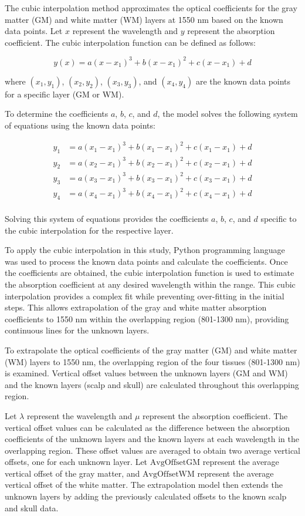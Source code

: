 \documentclass[journal,twoside,web]{ieeecolor}
\begin{document}
The cubic interpolation method approximates the optical coefficients for the gray matter (GM) and white matter (WM) layers at 1550 nm based on the 
known data points. Let $x$ represent the wavelength and $y$ represent the absorption coefficient. The cubic interpolation function can be defined as follows:

\[
y(x) = a(x-x_1)^3 + b(x-x_1)^2 + c(x-x_1) + d
\]

where $(x_1, y_1)$, $(x_2, y_2)$, $(x_3, y_3)$, and $(x_4, y_4)$ are the known data points for a specific layer (GM or WM).

To determine the coefficients $a$, $b$, $c$, and $d$, the model solves the following system of equations using the known data points:

\[
\begin{aligned}
y_1 &= a(x_1-x_1)^3 + b(x_1-x_1)^2 + c(x_1-x_1) + d \\
y_2 &= a(x_2-x_1)^3 + b(x_2-x_1)^2 + c(x_2-x_1) + d \\
y_3 &= a(x_3-x_1)^3 + b(x_3-x_1)^2 + c(x_3-x_1) + d \\
y_4 &= a(x_4-x_1)^3 + b(x_4-x_1)^2 + c(x_4-x_1) + d \\
\end{aligned}
\]

Solving this system of equations provides the coefficients $a$, $b$, $c$, and $d$ specific to the cubic interpolation for the respective layer.

To apply the cubic interpolation in this study, Python programming language was used to process the known data points and calculate the coefficients. 
Once the coefficients are obtained, the cubic interpolation function is used to estimate the absorption coefficient at any desired wavelength within the range. 
This cubic interpolation provides a complex fit while preventing over-fitting in the initial steps. This allows extrapolation of the gray and white matter 
absorption coefficients to 1550 nm within the overlapping region (801-1300 nm), providing continuous lines for the unknown layers.

To extrapolate the optical coefficients of the gray matter (GM) and white matter (WM) layers to 1550 nm, the overlapping region of the four tissues 
(801-1300 nm) is examined. Vertical offset values between the unknown layers (GM and WM) and the known layers (scalp and skull) are calculated throughout 
this overlapping region.

Let \( \lambda \) represent the wavelength and \( \mu \) represent the absorption coefficient. The vertical offset values can be calculated as the difference 
between the absorption coefficients of the unknown layers and the known layers at each wavelength in the overlapping region. These offset values are averaged 
to obtain two average vertical offsets, one for each unknown layer. Let \( \text{AvgOffsetGM} \) represent the average vertical offset of the gray matter, and 
\( \text{AvgOffsetWM} \) represent the average vertical offset of the white matter. The extrapolation model then extends the unknown layers by adding the 
previously calculated offsets to the known scalp and skull data.
\end{document}
